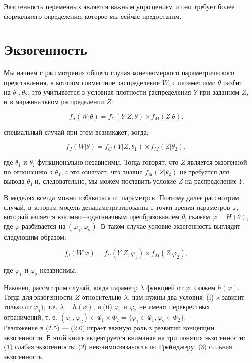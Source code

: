 	
	Экзогенность переменных является важным упрощением и оно требует более формального определения, которое мы сейчас предоставим. 

	
\section{Экзогенность}

	
Мы начнем с рассмотрения общего случая конечномерного параметрического представления, в котором совместное распределение $W$, с параметрами $\theta$ разбит на $\theta_{1},\theta_{2}$, это учитывается в условная плотности распределения $Y$ при заданном $Z$, и в маржинальном распределении $Z$:


\begin{equation}
f_{J}(W|\theta)=f_{C}(Y|Z,\theta)\times f_{M}(Z|\theta).
\end{equation}

специальный случай при этом возникакет, когда:

\[
f_{J}(W|\theta)=f_{C}(Y|Z,\theta_{1})\times f_{M}(Z|\theta_{2}),
\]

где $ \theta_{1} $ и $ \theta_{2} $ функционально независимы. Тогда говорят, что $Z$ является экзогенной по отношению к  $ \theta_{1} $, а это означает, что знание $ f_{M}(Z|\theta_{2}) $  не требуется для вывода $ \theta_{1} $ и, следовательно, мы можем поставить условие $Z$ на распределение $Y$. 


	В моделях всегда можно избавиться от параметров. Поэтому далее рассмотрим случай, в котором модель депараметризированна с точки зрения параметров $\varphi$, который является взаимно---однозначным преобразованием $\theta$, скажем $\varphi=H(\theta)$, где $\varphi$ разбивается на $(\varphi_{1},\varphi_{2})$. В таком случае условие экзогенность выглядит следующим образом:
	
\begin{equation}
f_{J}(W|\varphi)=f_{C}(Y|Z,\varphi_{1})\times f_{M}(Z|\varphi_{2}),
\end{equation}

где $\varphi_{1}$ и $\varphi_{2}$ независимы.


Наконец, рассмотрим случай, когда параметр $\lambda$ функцией от $\varphi$, скажем $h(\varphi)$. Тогда для экзогенности $Z$ относительно $\lambda$, нам нужны два условия: (i) $\lambda$ зависит только от $ \varphi_{1}) $, т.е. $\lambda=h(\varphi)$, и (ii) $\varphi_{1}$ и $\varphi_{2}$ не имеют перекрестных ограничений, т. е. $(\varphi_{1}, \varphi_{2}) \in \Phi_{1}\times\Phi_{2} = \lbrace\varphi_{1} \in \Phi_{1}, \varphi_{2} \in \Phi_{2}\rbrace$. \\
Разложение в (2.5) --- (2.6) играет важную роль в развитии концепции экзогенности. В этой книге акцентруется внимание на три понятия экзогенности: (1) слабая экзогенность; (2) невзаимосвязаность по Грейнджеру; (3) сильная экзогенность.

